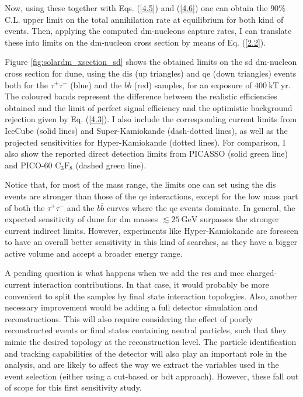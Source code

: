 Now, using these together with Eqs. (\ref{4.5}) and (\ref{4.6}) one can obtain the $90\%$ C.L. upper limit on the total annihilation rate at equilibrium for both kind of events. Then, applying the computed \gls{dm}-nucleons capture rates, I can translate these into limits on the \gls{dm}-nucleon cross section by means of Eq. (\ref{2.2}).

Figure \ref{fig:solardm_xsection_sd} shows the obtained limits on the \gls{sd} \gls{dm}-nucleon cross section for \gls{dune}, using the \gls{dis} (up triangles) and \gls{qe} (down triangles) events both for the $\tau^{+}\tau^{-}$ (blue) and the $b\bar{b}$ (red) samples, for an exposure of $400 \ \mathrm{kT} \ \mathrm{yr}$. The coloured bands represent the difference between the realistic efficiencies obtained and the limit of perfect signal efficiency and the optimistic background rejection given by Eq. (\ref{4.3}). I also include the corresponding current limits from IceCube \cite{IceCube2021} (solid lines) and Super-Kamiokande \cite{Super-Kamiokande2015} (dash-dotted lines), as well as the projected sensitivities for Hyper-Kamiokande \cite{Bell2021} (dotted lines). For comparison, I also show the reported direct detection limits from PICASSO \cite{Behnke2016} (solid green line) and PICO-60 $\mathrm{C}_{3}\mathrm{F}_{8}$ \cite{PICO2019} (dashed green line).

Notice that, for most of the mass range, the limits one can set using the \gls{dis} events are stronger than those of the \gls{qe} interactions, except for the low mass part of both the $\tau^{+}\tau^{-}$ and the $b\bar{b}$ curves where the \gls{qe} events dominate. In general, the expected sensitivity of \gls{dune} for \gls{dm} masses $\lesssim 25 \ \mathrm{GeV}$ surpasses the stronger current indirect limits. However, experiments like Hyper-Kamiokande are foreseen to have an overall better sensitivity in this kind of searches, as they have a bigger active volume and accept a broader energy range.

A pending question is what happens when we add the \gls{res} and \gls{mec} charged-current interaction contributions. In that case, it would probably be more convenient to split the samples by final state interaction topologies. Also, another necessary improvement would be adding a full detector simulation and reconstructions. This will also require considering the effect of poorly reconstructed events or final states containing neutral particles, such that they mimic the desired topology at the reconstruction level. The particle identification and tracking capabilities of the detector will also play an important role in the analysis, and are likely to affect the way we extract the variables used in the event selection (either using a cut-based or \gls{bdt} approach). However, these fall out of scope for this first sensitivity study.

